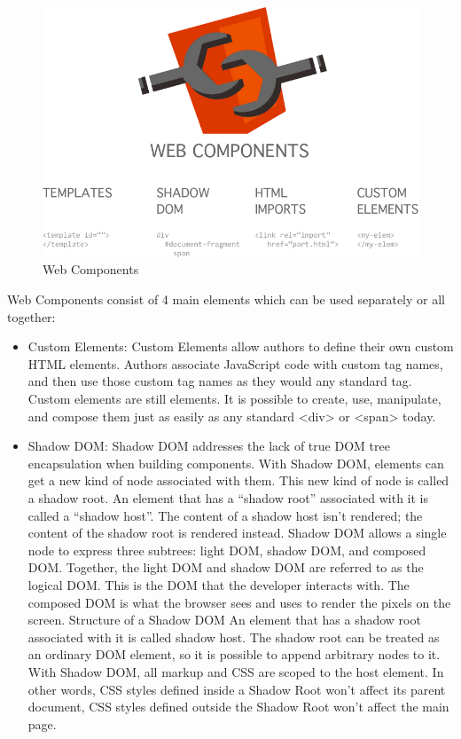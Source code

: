 \begin{figure}[htb]
 \centering
 \includegraphics[width=1.0\linewidth]{images/chapter3/web_cmpts.png}\hfill
 \caption[Web Components]{Web Components}
 \label{fig:fourV}
\end{figure}
Web Components consist of 4 main elements which can be used separately or all together:
\begin{itemize}
\item Custom Elements: Custom Elements allow authors to define their own custom HTML elements. Authors associate JavaScript code with custom tag names, and then use those custom tag names as they would any standard tag.  Custom elements are still elements.  It is possible to create, use,
manipulate, and compose them just as easily as any standard <div> or <span> today.\cite{tch_custom}
\end{itemize}
\begin{itemize}
\item Shadow DOM: Shadow DOM addresses the lack of true DOM tree encapsulation when building components. With Shadow DOM, elements can get a new kind of node associated with them. This new kind of node is called a shadow root.  An element that has a “shadow root”  associated with it is called  a “shadow host”. The content of a shadow host isn’t rendered; the content of the shadow root is rendered instead.  Shadow DOM allows   a single node to express three subtrees:  light DOM, shadow DOM,  and composed DOM. Together, the light DOM and shadow DOM are referred to as the logical DOM. This is the DOM that the developer interacts with. The composed DOM is what the browser sees and uses to render the pixels on the screen.\cite{tch_dom}
\newline
Structure of a Shadow DOM An element that has a shadow root associated with it is called shadow host. The shadow root can be treated as an ordinary DOM element, so it is possible to append arbitrary nodes to it. With Shadow DOM, all markup and CSS are scoped to the host element. In other words, CSS styles defined inside a Shadow Root won’t affect its parent document, CSS styles defined outside the Shadow Root won’t affect the main page.
\end{itemize}
